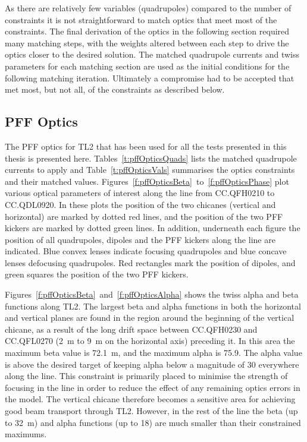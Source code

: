 As there are relatively few variables (quadrupoles) compared to the number of constraints  it is not straightforward to match optics that meet most of the constraints. The final derivation of the optics in the following section required many matching steps, with the weights altered between each step to drive the optics closer to the desired solution. The matched quadrupole currents and twiss parameters for each matching section are used as the initial conditions for the following matching iteration. Ultimately a compromise had to be accepted that met most, but not all, of the constraints as described below.

\subsection{PFF Optics}
\label{ss:tl2PFFOptics}

The PFF optics for TL2 that has been used for all the tests presented in this thesis is presented here. Tables~\ref{t:pffOpticsQuads} lists the matched quadrupole currents to apply and Table~\ref{t:pffOpticsVals} summarises the optics constraints and their matched values. Figures~\ref{f:pffOpticsBeta}~to~\ref{f:pffOpticsPhase} plot various optical parameters of interest along the line from CC.QFH0210 to CC.QDL0920. In these plots the position of the two chicanes (vertical and horizontal) are marked by dotted red lines, and the position of the two PFF kickers are marked by dotted green lines. In addition, underneath each figure the position of all quadrupoles, dipoles and the PFF kickers along the line are indicated. Blue convex lenses indicate focusing quadrupoles and blue concave lenses defocusing quadrupoles. Red rectangles mark the position of dipoles, and green squares the position of the two PFF kickers.

Figures~\ref{f:pffOpticsBeta}~and~\ref{f:pffOpticsAlpha} shows the twiss alpha and beta functions along TL2. The largest beta and alpha functions in both the horizontal and vertical planes are found in the region around the beginning of the vertical chicane, as a result of the long drift space between CC.QFH0230 and CC.QFL0270 (2~m to 9~m on the horizontal axis) preceding it. In this area the maximum beta value is 72.1~m, and the maximum alpha is 75.9. The alpha value is above the desired target of keeping alpha below a magnitude of 30 everywhere along the line. This constraint is primarily placed to minimise the strength of focusing in the line in order to reduce the effect of any remaining optics errors in the model. The vertical chicane therefore becomes a sensitive area for achieving good beam transport through TL2. However, in the rest of the line the beta (up to 32~m) and alpha functions (up to 18) are much smaller than their constrained maximums.

